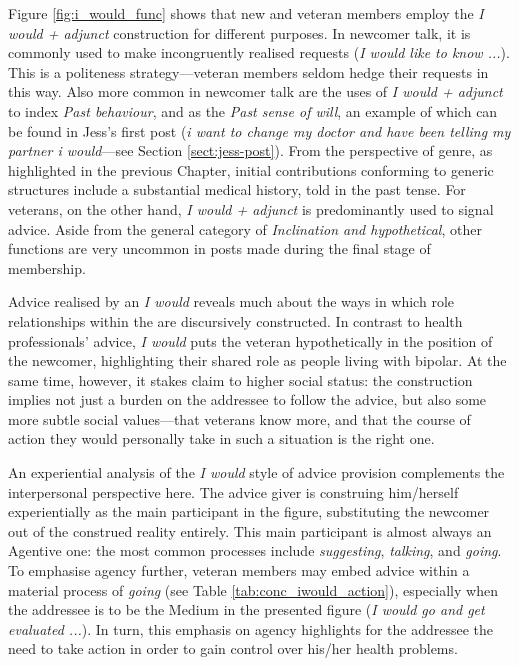 Figure \ref{fig:i_would_func} shows that new and veteran members employ the \emph{I would + adjunct} construction for different purposes. In newcomer talk, it is commonly used to make incongruently realised requests (\emph{I would like to know ...}). This is a politeness strategy---veteran members seldom hedge their requests in this way. Also more common in newcomer talk are the uses of \emph{I would + adjunct} to index \emph{Past behaviour}, and as the \emph{Past sense of will}, an example of which can be found in Jess's first \gls{post} (\emph{i want to change my doctor and have been telling my partner i would}---see Section \ref{sect:jess-post}). From the perspective of genre, as highlighted in the previous Chapter, initial contributions conforming to generic structures include a substantial medical history, told in the past tense. For veterans, on the other hand, \emph{I would + adjunct} is predominantly used to signal advice. Aside from the general category of \emph{Inclination and hypothetical}, other functions are very uncommon in \glspl{post} made during the final stage of membership.


Advice realised by an \emph{I would} reveals much about the ways in which role relationships within the  are discursively constructed. In contrast to health professionals' advice, \emph{I would} puts the veteran hypothetically in the position of the newcomer, highlighting their shared role as people living with \gls{bipolar}. At the same time, however, it stakes claim to higher social status: the construction implies not just a burden on the addressee to follow the advice, but also some more subtle social values---that veterans know more, and that the course of action they would personally take in such a situation is the right one. 

An experiential analysis of the \emph{I would} style of advice provision complements the interpersonal perspective here. The advice giver is construing him\slash herself experientially as the main participant in the figure, substituting the newcomer out of the construed reality entirely. This main participant is almost always an Agentive one: the most common processes include \emph{suggesting}, \emph{talking}, and \emph{going}. To emphasise agency further, veteran \glspl{member} may embed advice within a material process of \emph{going} (see Table \ref{tab:conc_iwould_action}), especially when the addressee is to be the Medium in the presented figure (\emph{I would go and get evaluated ...}). In turn, this emphasis on agency highlights for the addressee the need to take action in order to gain control over his\slash her health problems.

